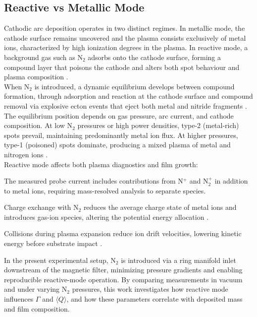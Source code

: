 \subsection{Reactive vs Metallic Mode}

Cathodic arc deposition operates in two distinct regimes. In metallic mode, the cathode surface remains uncovered and the plasma consists exclusively of metal ions, characterized by high ionization degrees in the plasma. In reactive mode, a background gas such as N$_2$ adsorbs onto the cathode surface, forming a compound layer that poisons the cathode and alters both spot behaviour and plasma composition \cite[Chap.~9.2]{cathodic_arcs}.\\

When N$_2$ is introduced, a dynamic equilibrium develops between compound formation, through adsorption and reaction at the cathode surface and compound removal via explosive ecton events that eject both metal and nitride fragments \cite[Chap.~9.3]{cathodic_arcs}. The equilibrium position depends on gas pressure, arc current, and cathode composition. At low N$_2$ pressures or high power densities, type-2 (metal-rich) spots prevail, maintaining predominantly metal ion flux. At higher pressures, type-1 (poisoned) spots dominate, producing a mixed plasma of metal and nitrogen ions \cite[Chap.~9.4]{cathodic_arcs}.\\

Reactive mode affects both plasma diagnostics and film growth:
\begin{compactitem}
	\item The measured probe current includes contributions from N$^+$ and N$_2^+$ in addition to metal ions, requiring mass-resolved analysis to separate species.
	
	\item Charge exchange with N$_2$ reduces the average charge state of metal ions and introduces gas-ion species, altering the potential energy allocation \cite[Chap.~9.4]{cathodic_arcs}.
	
	\item Collisions during plasma expansion reduce ion drift velocities, lowering kinetic energy before substrate impact \cite[Chap.~9.4]{cathodic_arcs}.
\end{compactitem}
\vspace{11pt}

In the present experimental setup, N$_2$ is introduced via a ring manifold inlet downstream of the magnetic filter, minimizing pressure gradients and enabling reproducible reactive-mode operation. By comparing measurements in vacuum and under varying N$_2$ pressures, this work investigates how reactive mode influences $\Gamma$ and $\langle Q \rangle$, and how these parameters correlate with deposited mass and film composition.

